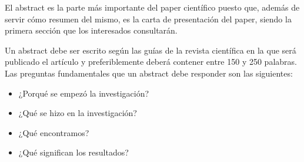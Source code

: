 El abstract es la parte más importante del paper científico puesto que, además de servir cómo resumen del mismo, es la carta de presentación del paper, siendo la primera sección que los interesados consultarán.

Un abstract debe ser escrito según las guías de la revista científica en la que será publicado el artículo y preferiblemente deberá contener entre 150 y 250 palabras. Las preguntas fundamentales que un abstract debe responder son las siguientes:

\begin{itemize}

    \item ¿Porqué se empezó la investigación?
    \item ¿Qué se hizo en la investigación?
    \item ¿Qué encontramos?
    \item ¿Qué significan los resultados?

\end{itemize}

\cite{meo_anatomy_2018}


